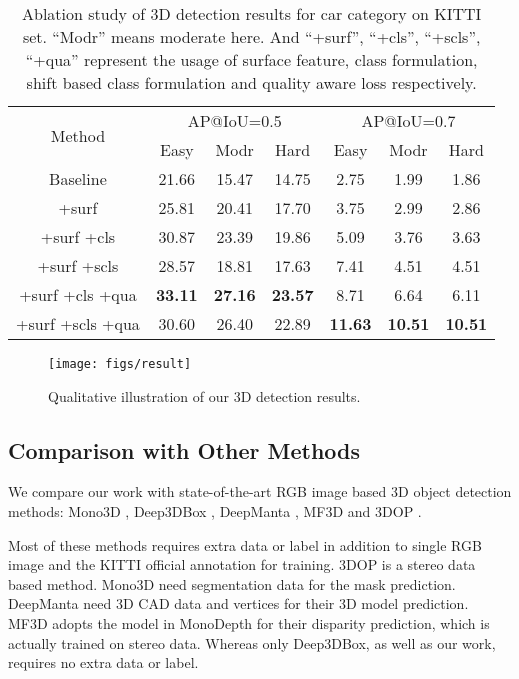 \documentclass[10pt,twocolumn,letterpaper]{article}
\begin{document}
\begin{table}[!ht]
\setlength{\tabcolsep}{1mm}
\footnotesize
\begin{center}
\begin{tabular}{| c || c | c | c || c | c | c |}
\hline
\multirow{2}{*}{Method} & \multicolumn{3}{c|}{AP@IoU=0.5} 
& \multicolumn{3}{c|}{AP@IoU=0.7} \\
\cline{2-7}
& Easy & Modr & Hard & Easy & Modr & Hard  \\
\hline
Baseline & 21.66 & 15.47 & 14.75 & 2.75 & 1.99 & 1.86 \\
+surf  & 25.81 & 20.41 & 17.70 & 3.75 & 2.99 & 2.86 \\
+surf +cls & 30.87 & 23.39 & 19.86 & 5.09 & 3.76 & 3.63 \\
+surf +scls & 28.57 & 18.81 & 17.63 & 7.41 & 4.51 & 4.51 \\
+surf +cls +qua & \textbf{33.11} & \textbf{27.16} & \textbf{23.57} & 8.71 & 6.64 & 6.11 \\
+surf +scls +qua & 30.60 & 26.40 & 22.89 & \textbf{11.63} & \textbf{10.51} & \textbf{10.51} \\
\hline
\end{tabular}
\vspace{1mm}
\caption{Ablation study of 3D detection results for car category on KITTI  set. ``Modr'' means moderate here. And ``+surf'', ``+cls'', ``+scls'', ``+qua'' represent the usage of surface feature, class formulation, shift based class formulation and quality aware loss respectively.}
\label{tab:ablation}
\end{center}
\end{table}

\begin{figure*}[!ht]
\centering
\texttt{[image: figs/result]}
\caption{Qualitative illustration of our 3D detection results.}
\label{fig:result}
\end{figure*}
\vspace{-3mm}

\subsection{Comparison with Other Methods}

We compare our work with state-of-the-art RGB image based 3D object detection methods:  Mono3D \cite{mono3d}, Deep3DBox \cite{deep3dbox}, DeepManta \cite{deepmanta}, MF3D \cite{mfusion} and 3DOP \cite{3dop}. 

Most of these methods requires extra data or label in addition to single RGB image and the KITTI official annotation for training. 3DOP is a stereo data based method. Mono3D need segmentation data for the mask prediction. DeepManta need 3D CAD data and vertices for their 3D model prediction. MF3D adopts the model in MonoDepth \cite{monodepth} for their disparity prediction, which is actually trained on stereo data. Whereas only Deep3DBox, as well as our work, requires no extra data or label.
\end{document}
